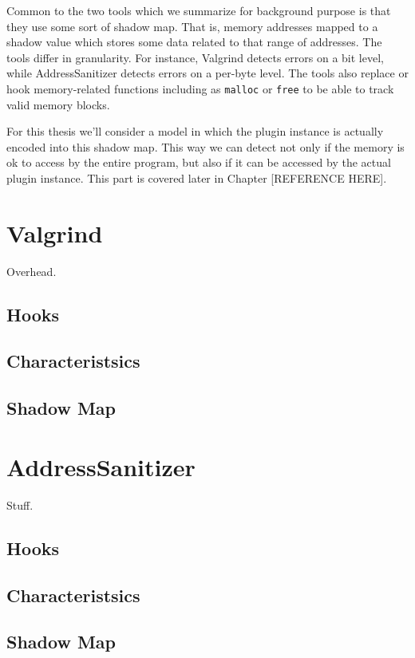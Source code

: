 Common to the two tools which we summarize for background purpose is that they
use some sort of shadow map. That is, memory addresses mapped to a shadow value
which stores some data related to that range of addresses. The tools differ in
granularity. For instance, Valgrind detects errors on a bit level, while
AddressSanitizer detects errors on a per-byte level. The tools also replace or
hook memory-related functions including as \texttt{malloc} or \texttt{free} to
be able to track valid memory blocks.

For this thesis we'll consider a model in which the plugin instance is actually
encoded into this shadow map. This way we can detect not only if the memory is
ok to access by the entire program, but also if it can be accessed by the actual
plugin instance. This part is covered later in Chapter [REFERENCE HERE].


\section {Valgrind}

Overhead.

\subsection {Hooks}

\subsection {Characteristsics}

\subsection {Shadow Map}


\section {AddressSanitizer}

Stuff.

\subsection {Hooks}

\subsection {Characteristsics}

\subsection {Shadow Map}


